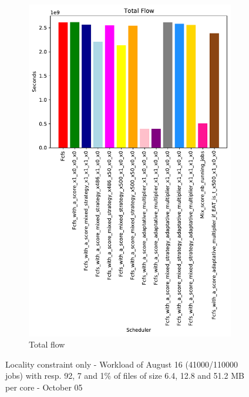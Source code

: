 \documentclass[a4paper]{article}
\begin{document}
\begin{figure}[H]
\begin{subfigure}[b]{0.4\linewidth}\centering\includegraphics[width=0.9\linewidth]{MBSS/plot/Results_FCFS_Score_Adaptative_Multiplier_2022-08-16->2022-08-16_V9271_Total_flow_450_128_32_256_4_1024.pdf}\caption{Total flow}\end{subfigure}
\caption{Locality constraint only - Workload of August 16 (41000/110000 jobs) with resp. 92, 7 and 1\% of files of size 6.4, 12.8 and 51.2 MB per core - October 05}\end{figure}
\end{document}
